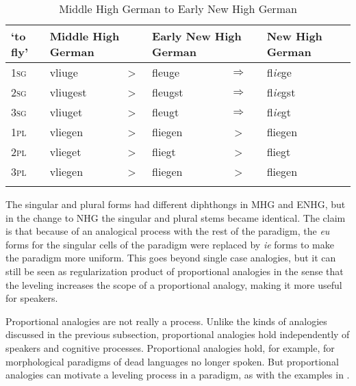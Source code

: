 
\begin{table}
    \small
    \caption{Middle High German to Early New High German}\label{tab:exe-change-nhg}
    \begin{tabular}[t]{llclcl}
      \lsptoprule
      `to fly' & \multicolumn{2}{l}{Middle High German} & \multicolumn{2}{l}{Early New High German} & New High German                            \\
      \midrule
      \textsc{1sg}      & vliuge                                 & >                                         & fleuge  & $\Rightarrow$ & fl\textit{ie}ge  \\
      \textsc{2sg}      & vliugest                               & >                                         & fleugst & $\Rightarrow$ & fl\textit{ie}gst \\
      \textsc{3sg}      & vliuget                                & >                                         & fleugt  & $\Rightarrow$ & fl\textit{ie}gt  \\
      \textsc{1pl}      & vliegen                                & >                                         & fliegen & >             & fliegen          \\
      \textsc{2pl}      & vlieget                                & >                                         & fliegt  & >             & fliegt           \\
      \textsc{3pl}      & vliegen                                & >                                         & fliegen & >             & fliegen          \\
      \lspbottomrule
    \end{tabular}
\end{table}

The singular and plural forms had different diphthongs in MHG and ENHG, but in the change to NHG the singular and plural stems became identical. The claim is that because of an analogical process with the rest of the paradigm, the \textit{eu} forms for the singular cells of the paradigm were replaced by \textit{ie} forms to make the paradigm more uniform. This goes beyond single case analogies, but it can still be seen as regularization product of proportional analogies in the sense that the leveling increases the scope of a proportional analogy, making it more useful for speakers.

Proportional analogies are not really a process. Unlike the kinds of analogies discussed in the previous subsection, proportional analogies hold independently of speakers and cognitive processes. Proportional analogies hold, for example, for morphological paradigms of dead languages no longer spoken. But proportional analogies can motivate a leveling process in a paradigm, as with the examples in .


